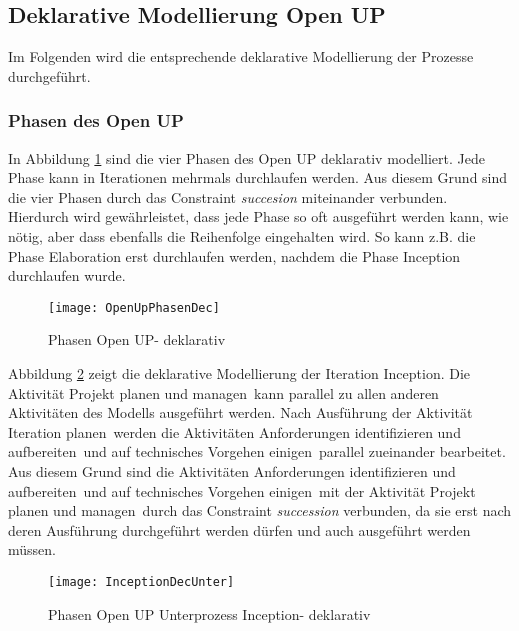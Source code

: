 \clearpage

\subsection{Deklarative Modellierung Open UP}

Im Folgenden wird die entsprechende deklarative Modellierung der Prozesse durchgeführt.

\subsubsection{Phasen des Open UP}


In Abbildung \ref{fig:OpenUpPhasenDec} sind die vier Phasen des Open UP deklarativ modelliert. Jede Phase kann in Iterationen mehrmals durchlaufen werden. Aus diesem Grund sind die vier Phasen durch das Constraint \textit{succesion} miteinander verbunden. Hierdurch wird gewährleistet, dass jede Phase so oft ausgeführt werden kann, wie nötig, aber dass ebenfalls die Reihenfolge eingehalten wird. So kann z.B. die Phase Elaboration erst durchlaufen werden, nachdem die Phase Inception durchlaufen wurde.
\begin{figure}[htp]
\begin{center}
  \texttt{[image: OpenUpPhasenDec]} %
  \caption{Phasen Open UP- deklarativ}
  \label{fig:OpenUpPhasenDec}
\end{center}
\end{figure}




Abbildung \ref{fig:InceptionDecUnter} zeigt die deklarative Modellierung der Iteration \grqq Inception\grqq. Die Aktivität \grqq Projekt planen und managen\grqq \  kann parallel zu allen anderen Aktivitäten des Modells ausgeführt werden.\newline
Nach Ausführung der Aktivität \grqq Iteration planen\grqq \ werden die Aktivitäten \grqq Anforderungen identifizieren und aufbereiten\grqq \ und \grqq auf technisches Vorgehen einigen\grqq \ parallel zueinander bearbeitet. Aus diesem Grund sind die Aktivitäten \grqq Anforderungen identifizieren und aufbereiten\grqq \ und \grqq auf technisches Vorgehen einigen\grqq \ mit der Aktivität \grqq Projekt planen und managen\grqq \ durch das Constraint \textit{succession} verbunden, da sie erst nach deren Ausführung durchgeführt werden dürfen und auch ausgeführt werden müssen. \newline

\begin{figure}[htp]
\begin{center}
  \texttt{[image: InceptionDecUnter]} %
  \caption{Phasen Open UP Unterprozess Inception- deklarativ}
  \label{fig:InceptionDecUnter}
\end{center}
\end{figure}

